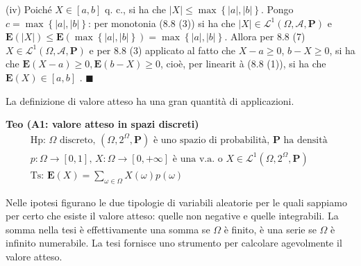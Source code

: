 \documentclass{article}
\begin{document}
(iv) Poich\'{e} $X\in \left[ a,b\right] $ q. c., si ha che $\left\vert
X\right\vert \leq \max \left\{ \left\vert a\right\vert ,\left\vert
b\right\vert \right\} $. Pongo $c=\max \left\{ \left\vert a\right\vert
,\left\vert b\right\vert \right\} $: per monotonia (8.8 (3)) si ha che $%
\left\vert X\right\vert \in \mathcal{L}^{1}\left( \Omega ,\mathcal{A},%
\mathbf{P}\right) $ e $\mathbf{E}\left( \left\vert X\right\vert \right) \leq 
\mathbf{E}\left( \max \left\{ \left\vert a\right\vert ,\left\vert
b\right\vert \right\} \right) =\max \left\{ \left\vert a\right\vert
,\left\vert b\right\vert \right\} $. Allora per 8.8 (7) $X\in \mathcal{L}%
^{1}\left( \Omega ,\mathcal{A},\mathbf{P}\right) $ e per 8.8 (3) applicato
al fatto che $X-a\geq 0$, $b-X\geq 0$, si ha che $\mathbf{E}\left(
X-a\right) \geq 0,\mathbf{E}\left( b-X\right) \geq 0$, cio\`{e}, per linearit%
\`{a} (8.8 (1)), si ha che $\mathbf{E}\left( X\right) \in \left[ a,b\right] $%
. $\blacksquare $

La definizione di valore atteso ha una gran quantit\`{a} di applicazioni.

\textbf{Teo (A1: valore atteso in spazi discreti)}%
\begin{gather*}
\text{Hp: }\Omega \text{ discreto, }\left( \Omega ,2^{\Omega },\mathbf{P}%
\right) \text{ \`{e} uno spazio di probabilit\`{a}, }\mathbf{P}\text{ ha
densit\`{a} } \\
p:\Omega \rightarrow \left[ 0,1\right] \text{, }X:\Omega \rightarrow \left[
0,+\infty \right] \text{ \`{e} una v.a. o }X\in \mathcal{L}^{1}\left( \Omega
,2^{\Omega },\mathbf{P}\right) \\
\text{Ts: }\mathbf{E}\left( X\right) =\sum_{\omega \in \Omega }X\left(
\omega \right) p\left( \omega \right)
\end{gather*}

Nelle ipotesi figurano le due tipologie di variabili aleatorie per le quali
sappiamo per certo che esiste il valore atteso: quelle non negative e quelle
integrabili. La somma nella tesi \`{e} effettivamente una somma se $\Omega $ 
\`{e} finito, \`{e} una serie se $\Omega $ \`{e} infinito numerabile. La
tesi fornisce uno strumento per calcolare agevolmente il valore atteso.
\end{document}
